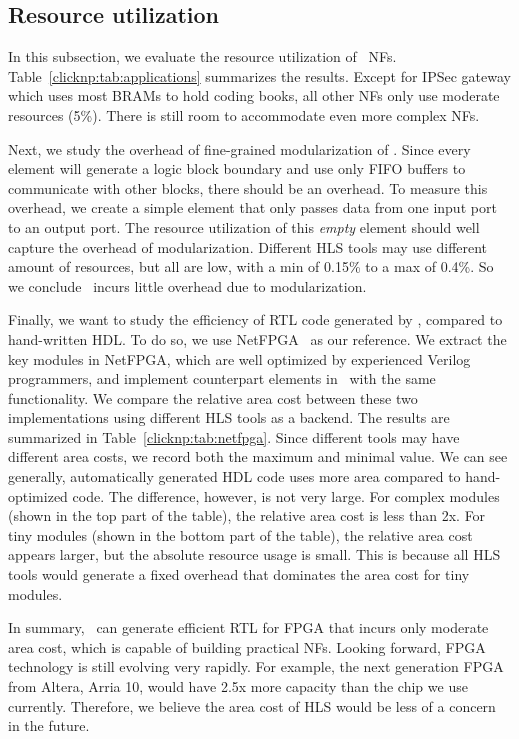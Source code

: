 \subsection{Resource utilization}

In this subsection, we evaluate the resource utilization of \name\ NFs.
Table~\ref{clicknp:tab:applications} summarizes the results. 
Except for IPSec gateway which uses most BRAMs to hold coding books, 
all other NFs only use moderate resources (5\%).  
There is still room to accommodate even more complex NFs.

Next, we study the overhead of fine-grained modularization of \name. 
Since every element will generate a logic block boundary and use only FIFO buffers to communicate with other blocks,
there should be an overhead.
To measure this overhead, we create a simple element that only passes data from one input port to an output port.
The resource utilization of this \textit{empty} element should well capture the overhead of modularization.
Different HLS tools may use different amount of resources, but all are low, with a min of 0.15\% to a max of 0.4\%.
So we conclude \name\ incurs little overhead due to modularization.

Finally, we want to study the efficiency of RTL code generated by \name, compared to hand-written HDL. 
To do so, we use NetFPGA~\cite{netfpga} as our reference.
We extract the key modules in NetFPGA, which are well optimized by experienced Verilog programmers, 
and implement counterpart elements in \name\ with the same functionality. 
We compare the relative area cost between these two implementations using different HLS tools as a backend.
The results are summarized in Table~\ref{clicknp:tab:netfpga}.
Since different tools may have different area costs, we record both the maximum and minimal value.
%
We can see generally, automatically generated HDL code uses more area compared to hand-optimized code.
The difference, however, is not very large. 
For complex modules (shown in the top part of the table), the relative area cost is less than 2x.
%
For tiny modules (shown in the bottom part of the table), the relative area cost appears larger, but the absolute 
resource usage is small.
This is because all HLS tools
would generate a fixed overhead that dominates the area cost for tiny modules. 

In summary, \name\ can generate efficient RTL for FPGA that incurs only moderate area cost, 
which is capable of building practical NFs.
Looking forward, FPGA technology is still evolving very rapidly. For example, the next
generation FPGA from Altera, Arria 10, would have 2.5x more capacity than the chip we use
currently. 
Therefore, we believe the area cost of HLS would be less of a concern in the future. 

